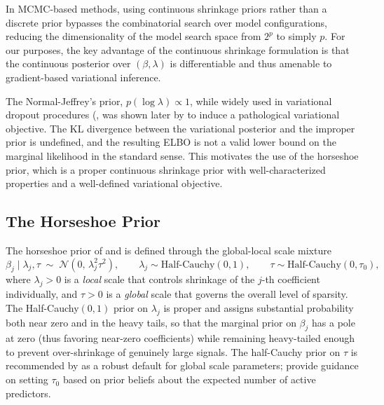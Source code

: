 In MCMC-based methods, using continuous shrinkage priors rather than a discrete prior bypasses the combinatorial search over model
configurations, reducing the dimensionality of the model search space from $2^p$ to simply $p$.  For our purposes, the key advantage of the continuous shrinkage formulation is that the continuous posterior over $(\beta, \lambda)$ is differentiable and thus amenable to gradient-based variational inference.

The Normal-Jeffrey's prior, $p(\log \lambda) \propto 1$, while widely used in variational dropout procedures (\citep{kingma_variational_2015, molchanov_variational_2017, louizos_learning_2018}, was shown later by \citet{hron_variational_2018} to induce a
pathological variational objective.  The KL divergence between the variational
posterior and the improper prior is undefined, and the resulting
ELBO is not a valid lower bound on the marginal likelihood in
the standard sense.  This motivates the use of the horseshoe
prior, which is a proper continuous shrinkage prior with
well-characterized properties and a well-defined variational
objective.


\subsection{The Horseshoe Prior}
\label{subsec:ch3-horseshoe}


The horseshoe prior of \citet{carvalho_handling_2009} and
\citet{carvalho_horseshoe_2010} is defined through the
global-local scale mixture
\begin{equation}
  \beta_j \mid \lambda_j, \tau \;\sim\; \mathcal{N}(0,\, \lambda_j^2 \tau^2),
  \qquad
  \lambda_j \sim \mathrm{Half\text{-}Cauchy}(0, 1),
  \qquad
  \tau \sim \mathrm{Half\text{-}Cauchy}(0, \tau_0),
  \label{eq:horseshoe}
\end{equation}
where $\lambda_j > 0$ is a \emph{local} scale that controls
shrinkage of the $j$-th coefficient individually, and $\tau > 0$
is a \emph{global} scale that governs the overall level of
sparsity.  The Half-Cauchy$(0,1)$ prior on $\lambda_j$ is proper
and assigns substantial probability both near zero and in the
heavy tails, so that the marginal prior on $\beta_j$ has a pole
at zero (thus favoring near-zero coefficients) while
remaining heavy-tailed enough to prevent over-shrinkage of
genuinely large signals.  The half-Cauchy prior on $\tau$ is
recommended by \citet{polson_half-cauchy_2012} as a robust
default for global scale parameters; \citet{piironen_hyperprior_2017}
provide guidance on setting $\tau_0$ based on prior beliefs about
the expected number of active predictors.

